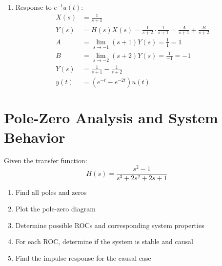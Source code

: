 \documentclass{article}
\begin{document}
\begin{enumerate}[label=(\alph*)]
    \item Response to $e^{-t}u(t)$:
    \begin{align*}
        X(s) &= \frac{1}{s + 1} \\
        Y(s) &= H(s)X(s) = \frac{1}{s + 2} \cdot \frac{1}{s + 1} = \frac{A}{s + 1} + \frac{B}{s + 2} \\
        A &= \lim_{s\to -1} (s + 1)Y(s) = \frac{1}{1} = 1 \\
        B &= \lim_{s\to -2} (s + 2)Y(s) = \frac{1}{-1} = -1 \\
        Y(s) &= \frac{1}{s + 1} - \frac{1}{s + 2} \\
        y(t) &= (e^{-t} - e^{-2t})u(t)
    \end{align*}
\end{enumerate}

\section{Pole-Zero Analysis and System Behavior}
Given the transfer function:
\[ H(s) = \frac{s^2 - 1}{s^3 + 2s^2 + 2s + 1} \]
\begin{enumerate}[label=(\alph*)]
    \item Find all poles and zeros
    \item Plot the pole-zero diagram
    \item Determine possible ROCs and corresponding system properties
    \item For each ROC, determine if the system is stable and causal
    \item Find the impulse response for the causal case
\end{enumerate}
\end{document}
